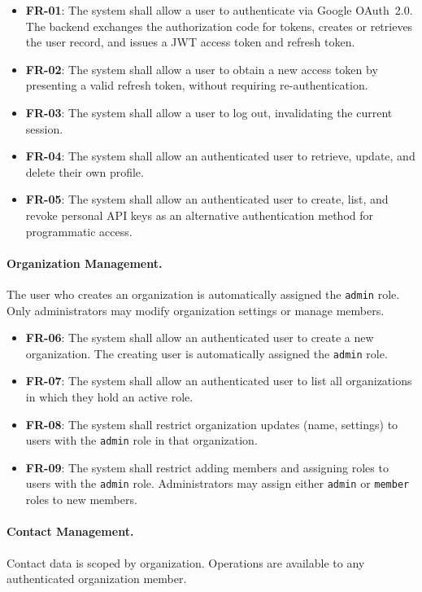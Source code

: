 \begin{itemize}
    \item \textbf{FR-01}: The system shall allow a user to authenticate via Google OAuth~2.0. The backend exchanges the authorization code for tokens, creates or retrieves the user record, and issues a JWT access token and refresh token.
    \item \textbf{FR-02}: The system shall allow a user to obtain a new access token by presenting a valid refresh token, without requiring re-authentication.
    \item \textbf{FR-03}: The system shall allow a user to log out, invalidating the current session.
    \item \textbf{FR-04}: The system shall allow an authenticated user to retrieve, update, and delete their own profile.
    \item \textbf{FR-05}: The system shall allow an authenticated user to create, list, and revoke personal API keys as an alternative authentication method for programmatic access.
\end{itemize}

\paragraph{Organization Management.}
The user who creates an organization is automatically assigned the \texttt{admin} role. Only administrators may modify organization settings or manage members.

\begin{itemize}
    \item \textbf{FR-06}: The system shall allow an authenticated user to create a new organization. The creating user is automatically assigned the \texttt{admin} role.
    \item \textbf{FR-07}: The system shall allow an authenticated user to list all organizations in which they hold an active role.
    \item \textbf{FR-08}: The system shall restrict organization updates (name, settings) to users with the \texttt{admin} role in that organization.
    \item \textbf{FR-09}: The system shall restrict adding members and assigning roles to users with the \texttt{admin} role. Administrators may assign either \texttt{admin} or \texttt{member} roles to new members.
\end{itemize}

\paragraph{Contact Management.}
Contact data is scoped by organization. Operations are available to any authenticated organization member.

